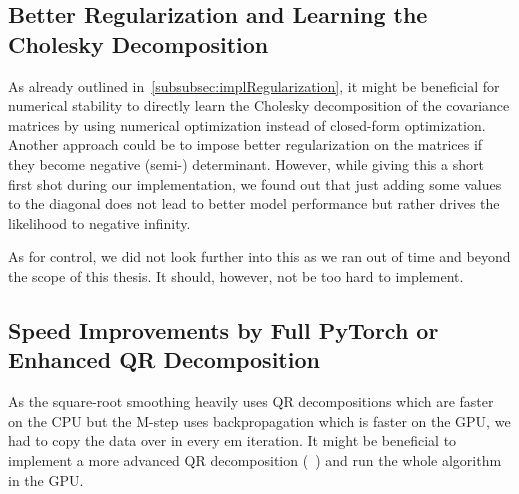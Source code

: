 	\subsection{Better Regularization and Learning the Cholesky Decomposition}
		As already outlined in~\autoref{subsubsec:implRegularization}, it might be beneficial for numerical stability to directly learn the Cholesky decomposition of the covariance matrices by using numerical optimization instead of closed-form optimization. Another approach could be to impose better regularization on the matrices if they become negative (semi-) determinant. However, while giving this a short first shot during our implementation, we found out that just adding some values to the diagonal does not lead to better model performance but rather drives the likelihood to negative infinity.

		As for control, we did not look further into this as we ran out of time and beyond the scope of this thesis. It should, however, not be too hard to implement.

	\subsection{Speed Improvements by Full PyTorch or Enhanced QR Decomposition}
		As the square-root smoothing heavily uses QR decompositions which are faster on the CPU but the M-step uses backpropagation which is faster on the GPU, we had to copy the data over in every \ac{em} iteration. It might be beneficial to implement a more advanced QR decomposition (\eg~\cite{andersonCommunicationAvoidingQRDecomposition2011a}) and run the whole algorithm in the GPU.
